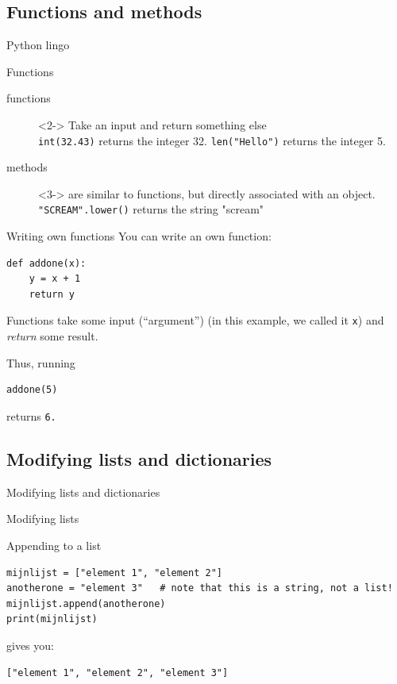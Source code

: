 \subsection*{Functions and methods}
\begin{frame}{Python lingo}
\begin{block}{Functions}
\begin{description}
\item[{\color{red}functions}]<2-> Take an input and return something else \\ {\tt{int(32.43})} returns the integer 32. \texttt{len("Hello")} returns the integer 5.\\ 
\item[{\color{red}methods}]<3-> are similar to functions, but directly associated with an object. {\tt{"SCREAM".lower()}} returns the string "scream"
\end{description}
\end{block}
\end{frame}


\begin{frame}[fragile]{Writing own functions}
You can write an own function:
\begin{lstlisting}
def addone(x):
    y = x + 1
    return y
\end{lstlisting}

Functions take some input (``argument'') (in this example, we called it \texttt{x}) and \emph{return} some result.
	
Thus, running
\begin{lstlisting}	
addone(5)
\end{lstlisting}
returns \tt{6}.
\end{frame}



\subsection*{Modifying lists and dictionaries}

\begin{frame}[plain]
Modifying lists and dictionaries
\end{frame}{}
	
\begin{frame}[fragile]{Modifying lists}
\begin{block}{Appending to a list}
\begin{lstlisting}
mijnlijst = ["element 1", "element 2"]
anotherone = "element 3"   # note that this is a string, not a list!
mijnlijst.append(anotherone)
print(mijnlijst)
\end{lstlisting}
gives you:
\begin{lstlisting}
["element 1", "element 2", "element 3"]
\end{lstlisting}
\end{block}
\end{frame}



